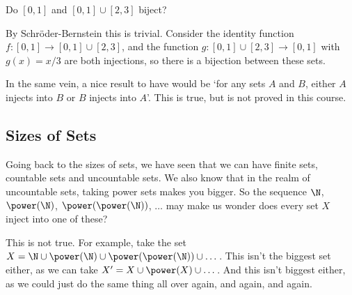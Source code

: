 \begin{example}
	Do $[0, 1]$ and $[0, 1] \cup [2, 3]$ biject?

	By Schröder-Bernstein this is trivial. Consider the identity function $f: [0, 1] \rightarrow [0, 1] \cup [2, 3]$, and the function $g : [0, 1] \cup [2, 3] \rightarrow [0, 1]$ with $g(x) = x/3$ are both injections, so there is a bijection between these sets.
\end{example}

In the same vein, a nice result to have would be `for any sets $A$ and $B$, either $A$ injects into $B$ or $B$ injects into $A$'. This is true, but is not proved in this course.


\subsection{Sizes of Sets}

Going back to the sizes of sets, we have seen that we can have finite sets, countable sets and uncountable sets. We also know that in the realm of uncountable sets, taking power sets makes you bigger. So the sequence $\N$, $\power(\N)$, $\power(\power(\N))$, $\dots$ may make us wonder does every set $X$ inject into one of these?

This is not true. For example, take the set $X = \N \cup \power(\N) \cup \power(\power(\N)) \cup \dots$. This isn't the biggest set either, as we can take $X' = X \cup \power(X) \cup \dots$. And this isn't biggest either, as we could just do the same thing all over again, and again, and again.




	





